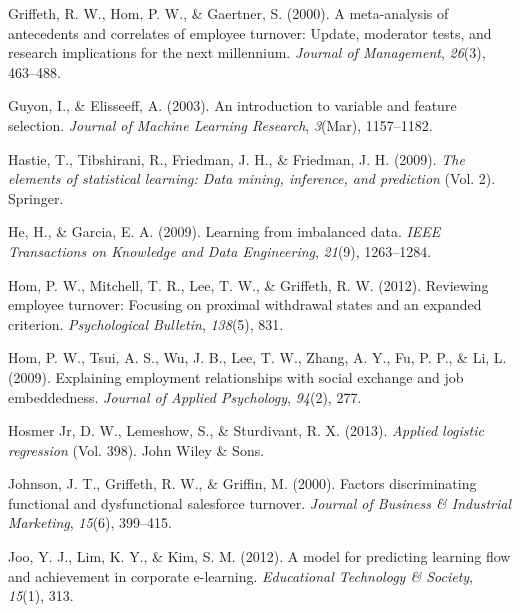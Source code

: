 \documentclass[
  jou]{apa6}
\newlength{\cslhangindent}
\newlength{\cslentryspacingunit} %
\newenvironment{CSLReferences}[2] %
 {%
  \setlength{\parindent}{0pt}
  \ifodd #1
  \let\oldpar\par
  \def\par{\hangindent=\cslhangindent\oldpar}
  \fi
  \setlength{\parskip}{#2\cslentryspacingunit}
 }%
 {}
\begin{document}
\begin{CSLReferences}{1}{0}
\leavevmode{}%
Griffeth, R. W., Hom, P. W., \& Gaertner, S. (2000). A meta-analysis of antecedents and correlates of employee turnover: Update, moderator tests, and research implications for the next millennium. \emph{Journal of Management}, \emph{26}(3), 463--488.

\leavevmode{}%
Guyon, I., \& Elisseeff, A. (2003). An introduction to variable and feature selection. \emph{Journal of Machine Learning Research}, \emph{3}(Mar), 1157--1182.

\leavevmode{}%
Hastie, T., Tibshirani, R., Friedman, J. H., \& Friedman, J. H. (2009). \emph{The elements of statistical learning: Data mining, inference, and prediction} (Vol. 2). Springer.

\leavevmode{}%
He, H., \& Garcia, E. A. (2009). Learning from imbalanced data. \emph{IEEE Transactions on Knowledge and Data Engineering}, \emph{21}(9), 1263--1284.

\leavevmode{}%
Hom, P. W., Mitchell, T. R., Lee, T. W., \& Griffeth, R. W. (2012). Reviewing employee turnover: Focusing on proximal withdrawal states and an expanded criterion. \emph{Psychological Bulletin}, \emph{138}(5), 831.

\leavevmode{}%
Hom, P. W., Tsui, A. S., Wu, J. B., Lee, T. W., Zhang, A. Y., Fu, P. P., \& Li, L. (2009). Explaining employment relationships with social exchange and job embeddedness. \emph{Journal of Applied Psychology}, \emph{94}(2), 277.

\leavevmode{}%
Hosmer Jr, D. W., Lemeshow, S., \& Sturdivant, R. X. (2013). \emph{Applied logistic regression} (Vol. 398). John Wiley \& Sons.

\leavevmode{}%
Johnson, J. T., Griffeth, R. W., \& Griffin, M. (2000). Factors discriminating functional and dysfunctional salesforce turnover. \emph{Journal of Business \& Industrial Marketing}, \emph{15}(6), 399--415.

\leavevmode{}%
Joo, Y. J., Lim, K. Y., \& Kim, S. M. (2012). A model for predicting learning flow and achievement in corporate e-learning. \emph{Educational Technology \& Society}, \emph{15}(1), 313.


\end{CSLReferences}
\end{document}
